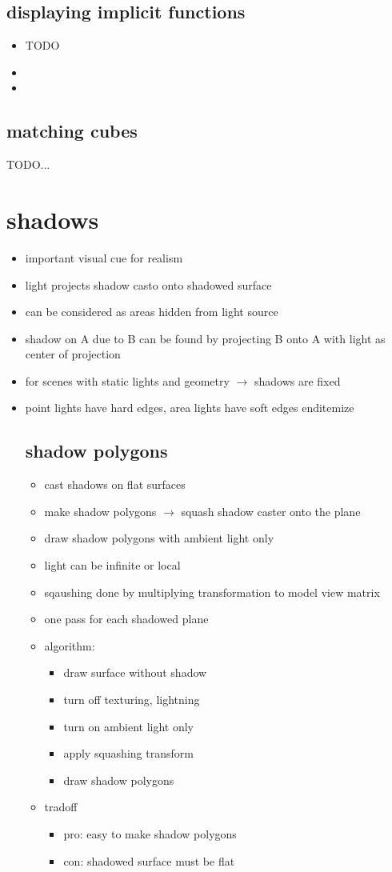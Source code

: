 \documentclass[11pt,a4paper]{article}
\begin{document}
\subsection{displaying implicit functions}
\begin{itemize}
	\item TODO
	\item 
	\item 
\end{itemize}
\subsection{matching cubes}
TODO...

\section{shadows}
\begin{itemize}
	\item important visual cue for realism
	\item light projects shadow casto onto shadowed surface
	\item can be considered as areas hidden from light source
	\item shadow on A due to B can be found by projecting B onto A with light as center of projection
	\item for scenes with static lights and geometry $\rightarrow$ shadows are fixed
	\item point lights have hard edges, area lights have soft edges
end{itemize}
\subsection{shadow polygons}
\begin{itemize}
	\item cast shadows on flat surfaces
	\item make shadow polygons $\rightarrow$ squash shadow caster onto the plane
	\item draw shadow polygons with ambient light only
	\item light can be infinite or local
	\item sqaushing done by multiplying transformation to model view matrix
	\item one pass for each shadowed plane
	\item algorithm:
	\begin{itemize}
		\item draw surface without shadow
		\item turn off texturing, lightning
		\item turn on ambient light only
		\item apply squashing transform
		\item draw shadow polygons
	\end{itemize}
	\item tradoff
	\begin{itemize}
		\item pro: easy to make shadow polygons
		\item con: shadowed surface must be flat
	\end{itemize}
\end{itemize}
\end{itemize}
\end{document}
